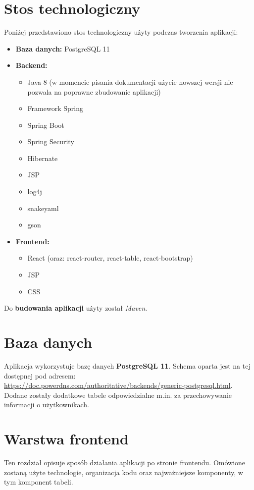 \documentclass[11pt]{article}
\begin{document}
\section{Stos technologiczny}
Poniżej przedstawiono stos technologiczny użyty podczas tworzenia aplikacji:
\begin{itemize}
\item \textbf{Baza danych:} PostgreSQL 11
\item \textbf{Backend:}
\begin{itemize}
\item Java 8 (w momencie pisania dokumentacji użycie nowszej wersji nie pozwala na poprawne zbudowanie aplikacji)
\item Framework Spring
\item Spring Boot
\item Spring Security
\item Hibernate
\item JSP
\item log4j
\item snakeyaml
\item gson
\end{itemize}
\item \textbf{Frontend:}
\begin{itemize}
\item React (oraz: react-router, react-table, react-bootstrap)
\item JSP
\item CSS
\end{itemize}
\end{itemize}
Do \textbf{budowania aplikacji} użyty został \emph{Maven}.

\section{Baza danych}
Aplikacja wykorzystuje bazę danych \textbf{PostgreSQL 11}. Schema oparta jest na tej dostępnej pod adresem: \url{https://doc.powerdns.com/authoritative/backends/generic-postgresql.html}. Dodane zostały dodatkowe tabele odpowiedzialne m.in. za przechowywanie informacji o użytkownikach.


\section{Warstwa frontend}
Ten rozdział opisuje sposób działania aplikacji po stronie frontendu. Omówione zostaną użyte technologie, organizacja kodu oraz najważniejsze komponenty, w tym komponent tabeli.
\end{document}
